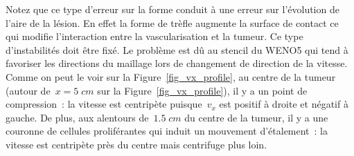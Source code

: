 \documentclass[11pt]{amsart}
\numberwithin{equation}{section}
\begin{document}
Notez que ce type d'erreur sur la forme conduit à une erreur sur l'évolution de l'aire de la lésion. En effet la forme de trèfle augmente la surface de contact ce qui modifie l'interaction entre la vascularisation et la tumeur. Ce type d'instabilités doit être fixé.
Le problème est dû au stencil du WENO5 qui tend à favoriser les directions du maillage lors de changement de direction de la vitesse.
Comme on peut le voir sur la Figure~\ref{fig_vx_profile}, 
au centre de la tumeur (autour de~$x=5\;cm$ sur la  Figure~\ref{fig_vx_profile}), il y a un point de compression~: 
la vitesse est centripète puisque~$v_x$ est positif à droite et négatif à gauche. 
De plus, aux alentours de~$1.5\;cm$ du centre de la tumeur, il y a une couronne de cellules proliférantes qui induit un mouvement d'étalement~: la vitesse est centripète près du centre mais centrifuge plus loin. 
\end{document}
